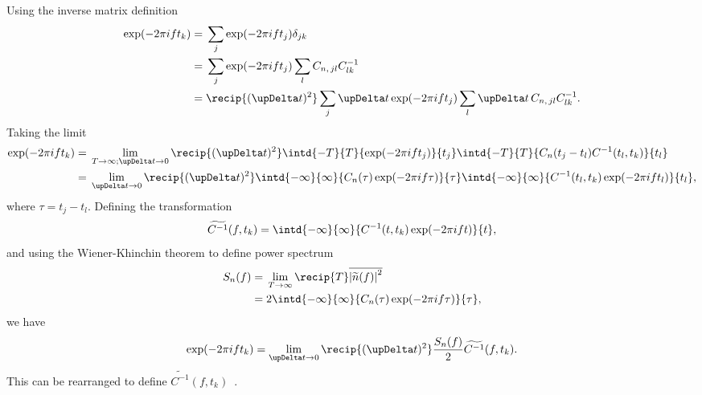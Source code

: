 Using the inverse matrix definition
\begin{align}
\exp(-2\pi i f t_k) = {} & \sum_j \exp(-2\pi ift_j) \delta_{jk} \nonumber \\
 = {} & \sum_j \exp(-2\pi ift_j) \sum_l C_{n,\,jl}C^{-1}_{lk} \nonumber \\
 = {} & \recip{(\upDelta t)^2} \sum_j \upDelta t \exp(-2\pi ift_j) \sum_l \upDelta t \, C_{n,\,jl}C^{-1}_{lk}.
\end{align}
Taking the limit
\begin{align}
\exp(-2\pi i f t_k) = {} & \lim_{T \rightarrow \infty;\upDelta t \rightarrow 0} \recip{(\upDelta t)^2} \intd{-T}{T}{\exp(-2\pi ift_j)}{t_j} \intd{-T}{T}{C_n(t_j-t_l)C^{-1}(t_l,t_k)}{t_l} \nonumber \\
 = {} & \lim_{\upDelta t \rightarrow 0} \recip{(\upDelta t)^2} \intd{-\infty}{\infty}{C_n(\tau)\exp(-2\pi if\tau)}{\tau} \intd{-\infty}{\infty}{C^{-1}(t_l,t_k)\exp(-2\pi if t_l)}{t_l},
\end{align}
where $\tau = t_j - t_l$. Defining the transformation
\begin{equation}
\widetilde{C^{-1}}(f,t_k) = \intd{-\infty}{\infty}{C^{-1}(t,t_k)\exp(-2\pi if t)}{t},
\end{equation}
and using the Wiener-Khinchin theorem to define power spectrum~\citep{Cutler1994}
\begin{align}
S_n(f) = {} & \lim_{T \rightarrow \infty} \recip{T} \overline{\left|\widetilde{n}(f)\right|^2} \\
 = {} & 2 \intd{-\infty}{\infty}{C_n(\tau)\exp(-2\pi i f\tau)}{\tau},
\end{align}
we have
\begin{equation}
\exp(-2\pi i f t_k) = \lim_{\upDelta t \rightarrow 0} \recip{(\upDelta t)^2} \frac{S_n(f)}{2} \widetilde{C^{-1}}(f,t_k).
\end{equation}
This can be rearranged to define $\widetilde{C^{-1}}(f,t_k)$~\citep{Finn1992}.

